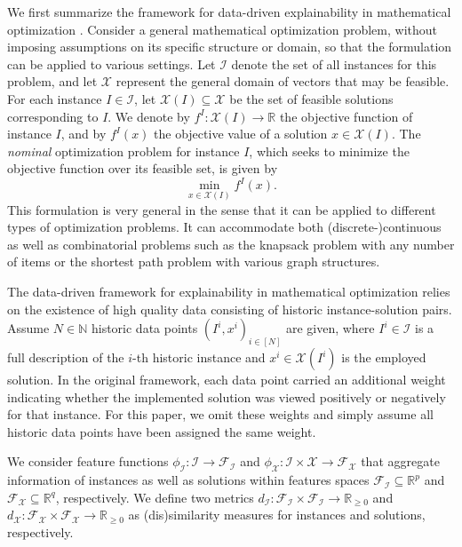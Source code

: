 \documentclass[11pt, a4paper]{article}
\newcommand{\I}{{\mathcal{I}}} %
\newcommand{\X}{{\mathcal{X}}} %
\newcommand{\F}{{\mathcal{F}}} %
\newcommand{\instfeaturespace}{\F_\I} %
\newcommand{\solfeaturespace}{\F_\X} %
\newcommand{\instance}{I}
\newcommand{\solution}{x}
\newcommand{\instanceindex}{i}
\newcommand{\instanceindextwo}{j}
\newcommand{\instfeaturemap}[1][(\instance^\instanceindex)]{\phi_\I#1} %
\newcommand{\solfeaturemap}[1][(\instance^\instanceindex,\solution^\instanceindex)]{\phi_\X#1} %
\newcommand{\soldist}[1][(\instanceindex,\instanceindextwo)]{d_\X#1} %
\begin{document}
We first summarize the framework for data-driven explainability in mathematical optimization \citep{aigner2024framework}.
Consider a general mathematical optimization problem, without imposing assumptions on its specific structure or domain, so that the formulation can be applied to various settings.
 Let $\I$ denote the set of all instances for this problem, and let $\mathcal{X}$ represent the general domain of vectors that may be feasible. For each instance $I \in \I$, let $\X(I) \subseteq \mathcal{X}$ be the set of feasible solutions corresponding to $I$.
We denote by $f^I : \X(I) \rightarrow \mathbb{R}$ the objective function of instance $I$, and by $f^I(x)$ the objective value of a solution $x \in \X(I)$. The \emph{nominal} optimization problem for instance $I$, which seeks to minimize the objective function over its feasible set, is given by
\begin{equation}
    \min_{x \in \X(I)} f^I(x). \label{Eq:nom_problem} \tag{Nom}
\end{equation}
This formulation is very general in the sense that it can be applied to different types of optimization problems. It can accommodate both (discrete-)continuous as well as combinatorial problems such as the knapsack problem with any number of items or the shortest path problem with various graph structures.


The data-driven framework for explainability in mathematical optimization relies on the existence of high quality data consisting of historic instance-solution pairs.
Assume $N \in \mathbb{N}$ historic data points $(I^i, x^i)_{i \in [N]}$ are given, where $I^i \in \mathcal{I}$ is a full description of the $i$-th historic instance and $x^i \in \mathcal{X}(I^i)$ is the employed solution.  In the original framework, each data point carried an additional weight indicating whether the implemented solution was viewed positively or negatively for that instance. For this paper, we omit these weights and simply assume all historic data points have been %
assigned the same weight.

We consider feature functions $\instfeaturemap[]:\I\rightarrow \instfeaturespace$ and $\solfeaturemap[]:\I \times \X \rightarrow \solfeaturespace$ 
that aggregate information of instances as well as solutions within features spaces $\instfeaturespace \subseteq \mathbb{R}^p$ and $\solfeaturespace \subseteq \mathbb{R}^q$, respectively. We define two metrics $d_{\I}:\instfeaturespace \times \instfeaturespace \rightarrow \mathbb{R}_{\ge 0}$ and $\soldist[]:\solfeaturespace \times \solfeaturespace \rightarrow \mathbb{R}_{\ge 0}$ as (dis)similarity measures for instances and solutions, respectively.
\end{document}
